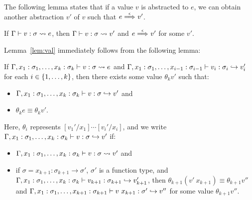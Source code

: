 The following lemma states that if a value \(v\) is abstracted to \(e\),
we can obtain another abstraction \(v'\) of \(v\) such that \(e
\stackrel{\epsilon}{\Longrightarrow}_{} v'\).
\begin{lemma}
\label{lem:val}
If \(\Gamma \vdash v : \sigma \leadsto e\), then \(\Gamma \vdash v : \sigma \leadsto v'\) and
\(e \stackrel{\epsilon}{\Longrightarrow}_{} v'\) for some \(v'\).
\end{lemma}
Lemma~\ref{lem:val} immediately follows from the following lemma:
\begin{lemma}
\label{lem:val_aux}
If \(\Gamma,x_1:\sigma_1,\dots,x_k:\sigma_k \vdash v : \sigma \leadsto e\) and
\(\Gamma,x_1:\sigma_1,\dots,x_{i-1}:\sigma_{i-1} \vdash v_i : \sigma_i \hookrightarrow v_i'\) for each \(i \in \{1,\dots,k\}\), then
there exists some value \(\theta_k v'\) such that:
\begin{itemize}
\item \(\Gamma,x_1:\sigma_1,\dots,x_k:\sigma_k \vdash v : \sigma \hookrightarrow v'\) and
\item \(\theta_k e \equiv \theta_k v'\).
\end{itemize}
Here, \(\theta_i\) represents \([v_1'/x_1]\cdots[v_i'/x_i]\), and we
write \(\Gamma,x_1:\sigma_1,\dots,x_k:\sigma_k \vdash v : \sigma \hookrightarrow v'\) if:
\begin{itemize}
\item \(\Gamma,x_1:\sigma_1,\dots,x_k:\sigma_k \vdash v : \sigma \leadsto v'\) and
\item if \(\sigma=x_{k+1}:\sigma_{k+1} \to \sigma'\),
\(\sigma'\) is a function type, and
\(\Gamma,x_1:\sigma_1,\dots,x_k:\sigma_k \vdash v_{k+1} : \sigma_{k+1} \hookrightarrow v_{k+1}'\), then
\(\theta_{k+1} (v'\ x_{k+1}) \equiv \theta_{k+1} v''\) and
\(\TT{\Gamma,x_1:\sigma_1,\dots,x_{k+1}:\sigma_{k+1}}{v\ x_{k+1}}{\sigma'}{v''}\)
for some value \(\theta_{k+1} v''\).
\end{itemize}
\end{lemma}
